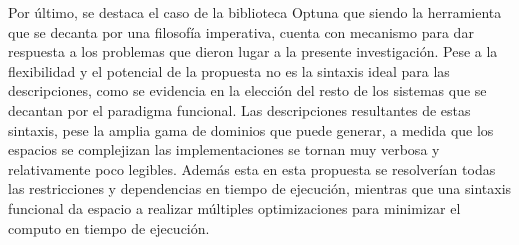 Por último, se destaca el caso de la biblioteca Optuna que siendo la herramienta
que se decanta por una filosofía imperativa, cuenta con mecanismo para dar respuesta
a los problemas que dieron lugar a la presente investigación. Pese a la flexibilidad
y el potencial de la propuesta no es la sintaxis ideal para las descripciones, como se
evidencia en la elección del resto de los sistemas que se decantan por el paradigma
funcional. Las descripciones resultantes de estas sintaxis, pese la amplia gama de
dominios que puede generar, a medida que los espacios se complejizan las implementaciones
se tornan muy verbosa y relativamente poco legibles. Además esta en esta propuesta se
resolverían todas las restricciones y dependencias en tiempo de ejecución, mientras
que una sintaxis funcional da espacio a realizar múltiples optimizaciones para
minimizar el computo en tiempo de ejecución.

